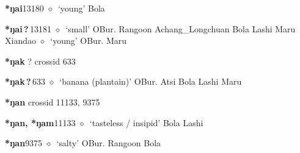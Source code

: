   \begin{list}{}{\leftmargin=1.5em \itemindent=-1.5em}
  \item {\footnotesize \textbf{*ŋai}}{\tiny 13180}
         $\diamond$~`young'
         Bola 
  \item {\footnotesize \textbf{*ŋai\,?\,}}{\tiny 13181}
\hspace{1ex}
         $\diamond$~`small'
         OBur. 
\hspace{1ex}
         Rangoon 
\hspace{1ex}
         Achang\_Longchuan 
\hspace{1ex}
         Bola 
\hspace{1ex}
         Lashi 
\hspace{1ex}
         Maru 
\hspace{1ex}
         Xiandao 
\hspace{1ex}
         $\diamond$~`young'
         OBur. 
\hspace{1ex}
         Maru 
  \end{list}
\item
\textbf{*ŋak}
?
  {\tiny crossid 633}
  \begin{list}{}{\leftmargin=1.5em \itemindent=-1.5em}
  \item {\footnotesize \textbf{*ŋak\,?\,}}{\tiny 633}
         $\diamond$~`banana (plantain)'
         OBur. 
\hspace{1ex}
         Atsi 
\hspace{1ex}
         Bola 
\hspace{1ex}
         Lashi 
\hspace{1ex}
         Maru 
  \end{list}
\item
\textbf{*ŋan}
  {\tiny crossid 11133, 9375}
  \begin{list}{}{\leftmargin=1.5em \itemindent=-1.5em}
  \item {\footnotesize \textbf{*ŋan, *ŋam}}{\tiny 11133}
         $\diamond$~`tasteless / insipid'
         Bola 
\hspace{1ex}
         Lashi 
  \item {\footnotesize \textbf{*ŋan}}{\tiny 9375}
\hspace{1ex}
         $\diamond$~`salty'
         OBur. 
\hspace{1ex}
         Rangoon 
\hspace{1ex}
         Bola 
  \end{list}
